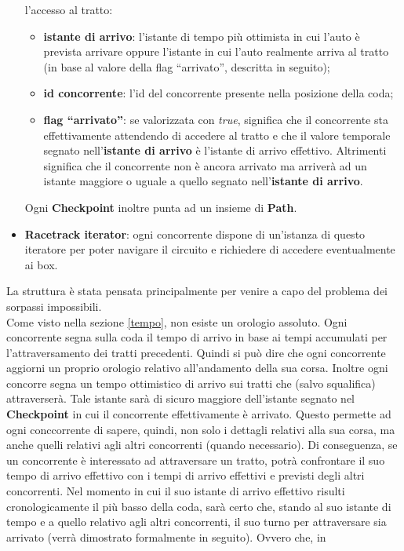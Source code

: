\begin{itemize}
l'accesso al tratto:
\begin{itemize}
\item \textbf{istante di arrivo}: l'istante di tempo più ottimista in cui l'auto
è prevista arrivare oppure l'istante in cui l'auto realmente
arriva al tratto (in base al valore della flag ``arrivato'', descritta in
seguito);
\item \textbf{id concorrente}: l'id del concorrente presente nella posizione
della coda;
\item \textbf{flag ``arrivato''}: se valorizzata con \emph{true}, significa che
il concorrente sta effettivamente attendendo di accedere al tratto
e che il valore temporale segnato nell'\textbf{istante di arrivo} è l'istante di
arrivo effettivo. Altrimenti significa che il concorrente non
è ancora arrivato ma arriverà ad un istante maggiore o uguale a quello segnato
nell'\textbf{istante di arrivo}.
\end{itemize}
Ogni \textbf{Checkpoint} inoltre punta ad un insieme di \textbf{Path}.
\item \textbf{Racetrack iterator}: ogni concorrente dispone di un'istanza di
questo iteratore per poter navigare il circuito e richiedere
di accedere eventualmente ai box.
\end{itemize}
La struttura è stata pensata principalmente per venire a capo del problema dei
sorpassi impossibili.\\
Come visto nella sezione \ref{tempo}, non esiste un orologio assoluto. Ogni
concorrente segna sulla
coda il tempo di arrivo in base ai tempi accumulati per l'attraversamento dei
tratti precedenti. Quindi si può dire che ogni
concorrente aggiorni un proprio orologio relativo all'andamento della sua corsa.
Inoltre ogni concorre segna
un tempo ottimistico di arrivo sui tratti che (salvo squalifica) attraverserà.
Tale istante sarà di sicuro maggiore dell'istante segnato
nel \textbf{Checkpoint} in cui il concorrente effettivamente è arrivato. Questo
permette ad ogni conccorrente di sapere, quindi, non solo
i dettagli relativi alla sua corsa, ma anche quelli relativi agli altri
concorrenti (quando necessario). Di conseguenza, se un concorrente
è interessato ad attraversare un tratto, potrà confrontare il suo tempo di
arrivo effettivo con i tempi di arrivo effettivi e previsti
degli altri concorrenti. Nel momento in cui il suo istante di arrivo effettivo
risulti cronologicamente il più basso della coda, sarà certo
che, stando al suo istante di tempo e a quello relativo agli altri concorrenti,
il suo turno per attraversare sia arrivato (verrà dimostrato formalmente in seguito). Ovvero che, in 
